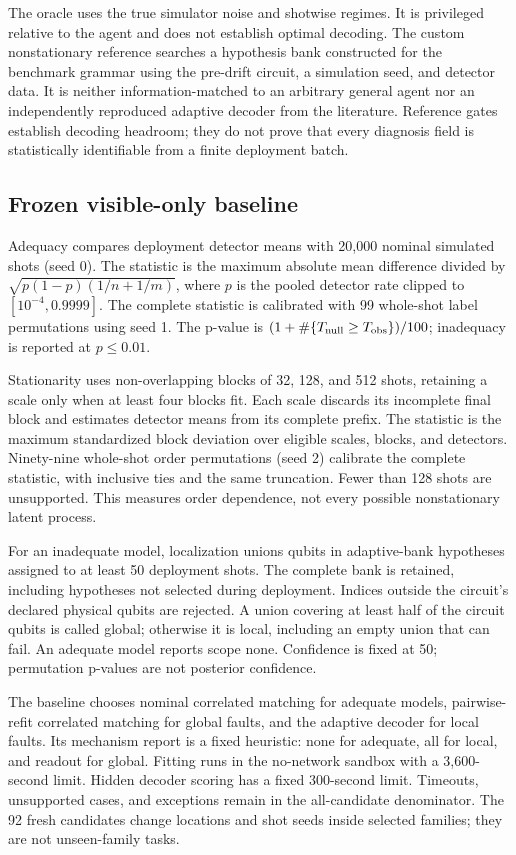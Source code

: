 The oracle uses the true simulator noise and shotwise regimes. It is privileged relative to the agent and does not establish optimal decoding. The custom nonstationary reference searches a hypothesis bank constructed for the benchmark grammar using the pre-drift circuit, a simulation seed, and detector data. It is neither information-matched to an arbitrary general agent nor an independently reproduced adaptive decoder from the literature. Reference gates establish decoding headroom; they do not prove that every diagnosis field is statistically identifiable from a finite deployment batch.

\subsection{Frozen visible-only baseline}
\label{app:baseline}
Adequacy compares deployment detector means with 20,000 nominal simulated shots (seed 0). The statistic is the maximum absolute mean difference divided by $\sqrt{p(1-p)(1/n+1/m)}$, where $p$ is the pooled detector rate clipped to $[10^{-4},0.9999]$. The complete statistic is calibrated with 99 whole-shot label permutations using seed 1. The p-value is $(1+\#\{T_{\rm null}\geq T_{\rm obs}\})/100$; inadequacy is reported at $p\leq0.01$.

Stationarity uses non-overlapping blocks of 32, 128, and 512 shots, retaining a scale only when at least four blocks fit. Each scale discards its incomplete final block and estimates detector means from its complete prefix. The statistic is the maximum standardized block deviation over eligible scales, blocks, and detectors. Ninety-nine whole-shot order permutations (seed 2) calibrate the complete statistic, with inclusive ties and the same truncation. Fewer than 128 shots are unsupported. This measures order dependence, not every possible nonstationary latent process.

For an inadequate model, localization unions qubits in adaptive-bank hypotheses assigned to at least 50 deployment shots. The complete bank is retained, including hypotheses not selected during deployment. Indices outside the circuit's declared physical qubits are rejected. A union covering at least half of the circuit qubits is called global; otherwise it is local, including an empty union that can fail. An adequate model reports scope none. Confidence is fixed at 50; permutation p-values are not posterior confidence.

The baseline chooses nominal correlated matching for adequate models, pairwise-refit correlated matching for global faults, and the adaptive decoder for local faults. Its mechanism report is a fixed heuristic: none for adequate, all for local, and readout for global. Fitting runs in the no-network sandbox with a 3,600-second limit. Hidden decoder scoring has a fixed 300-second limit. Timeouts, unsupported cases, and exceptions remain in the all-candidate denominator. The 92 fresh candidates change locations and shot seeds inside selected families; they are not unseen-family tasks.

